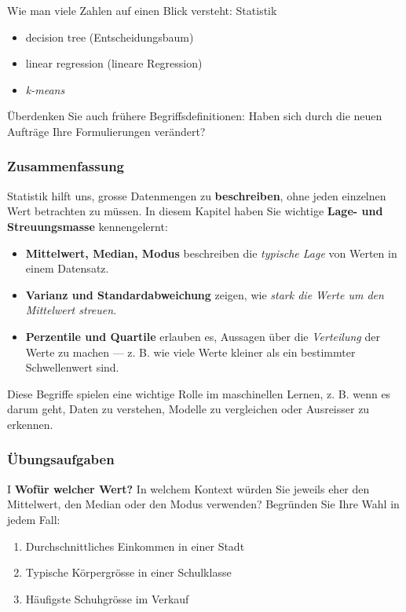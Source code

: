 \begin{lpu}{Wie man viele Zahlen auf einen Blick versteht: Statistik}
\begin{aufgabe}{6}
\begin{itemize}
  \item decision tree (Entscheidungsbaum)
  \item linear regression (lineare Regression)
  \item \textit{k-means}
\end{itemize}

Überdenken Sie auch frühere Begriffsdefinitionen: Haben sich durch die neuen Aufträge Ihre Formulierungen verändert?
\end{aufgabe}

\subsubsection*{Zusammenfassung}

Statistik hilft uns, grosse Datenmengen zu \textbf{beschreiben}, ohne jeden einzelnen Wert betrachten zu müssen. In diesem Kapitel haben Sie wichtige \textbf{Lage- und Streuungsmasse} kennengelernt:

\begin{itemize}
  \item \textbf{Mittelwert, Median, Modus} beschreiben die \emph{typische Lage} von Werten in einem Datensatz.
  \item \textbf{Varianz und Standardabweichung} zeigen, wie \emph{stark die Werte um den Mittelwert streuen}.
  \item \textbf{Perzentile und Quartile} erlauben es, Aussagen über die \emph{Verteilung} der Werte zu machen — z. B. wie viele Werte kleiner als ein bestimmter Schwellenwert sind.
\end{itemize}

Diese Begriffe spielen eine wichtige Rolle im maschinellen Lernen, z. B. wenn es darum geht, Daten zu verstehen, Modelle zu vergleichen oder Ausreisser zu erkennen.

\subsubsection*{Übungsaufgaben}

\begin{aufgabe}{I}
\textbf{Wofür welcher Wert?}  
In welchem Kontext würden Sie jeweils eher den Mittelwert, den Median oder den Modus verwenden?  
Begründen Sie Ihre Wahl in jedem Fall:
\begin{enumerate}
  \item Durchschnittliches Einkommen in einer Stadt  
  \item Typische Körpergrösse in einer Schulklasse  
  \item Häufigste Schuhgrösse im Verkauf  
\end{enumerate}
\end{aufgabe}


\end{lpu}
